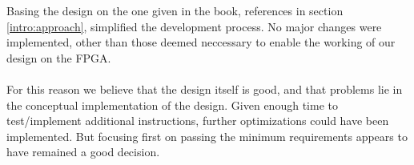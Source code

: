 Basing the design on the one given in the book, references in section
\ref{intro:approach}, simplified the development process. No major changes were
implemented, other than those deemed neccessary to enable the working of our
design on the FPGA.
\paragraph*{}
For this reason we believe that the design itself is good, and that problems lie
in the conceptual implementation of the design. Given enough time to
test/implement additional instructions, further optimizations could have been
implemented. But focusing first on passing the minimum requirements appears to
have remained a good decision.